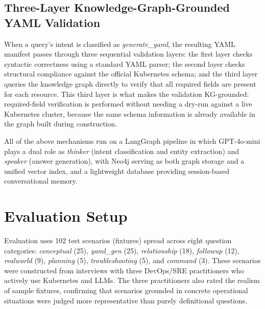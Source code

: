 \documentclass{ieeeaccess}
\begin{document}
\subsection{Three-Layer Knowledge-Graph-Grounded YAML Validation}

When a query's intent is classified as \textit{generate\_yaml}, the resulting YAML manifest passes through three sequential validation layers: the first layer checks syntactic correctness using a standard YAML parser; the second layer checks structural compliance against the official Kubernetes schema; and the third layer queries the knowledge graph directly to verify that all required fields are present for each resource. This third layer is what makes the validation KG-grounded: required-field verification is performed without needing a dry-run against a live Kubernetes cluster, because the same schema information is already available in the graph built during construction.

All of the above mechanisms run on a LangGraph pipeline in which GPT-4o-mini plays a dual role as \textit{thinker} (intent classification and entity extraction) and \textit{speaker} (answer generation), with Neo4j serving as both graph storage and a unified vector index, and a lightweight database providing session-based conversational memory.

\section{Evaluation Setup}
\label{sec:evaluasi}

Evaluation uses 102 test scenarios (fixtures) spread across eight question categories: \textit{conceptual} (25), \textit{yaml\_gen} (25), \textit{relationship} (18), \textit{followup} (12), \textit{realworld} (9), \textit{planning} (5), \textit{troubleshooting} (5), and \textit{command} (3). These scenarios were constructed from interviews with three DevOps/SRE practitioners who actively use Kubernetes and LLMs. The three practitioners also rated the realism of sample fixtures, confirming that scenarios grounded in concrete operational situations were judged more representative than purely definitional questions.
\end{document}
